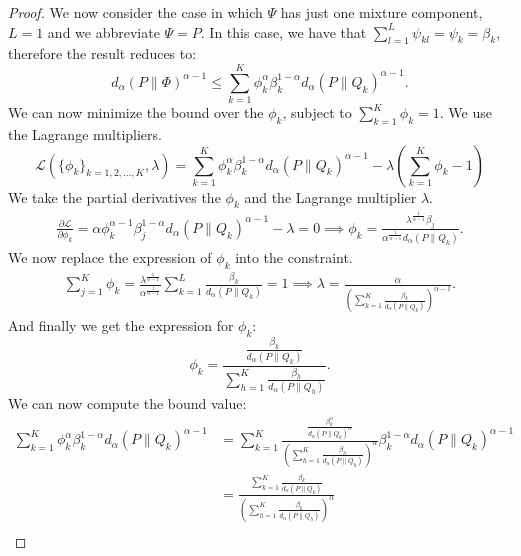 \documentclass{article}
\begin{document}
\armonic*
\begin{proof}
We now consider the case in which $\Psi$ has just one mixture component, \ie $L = 1$ and we abbreviate $\Psi = P$. In this case, we have that $\sum_{l=1}^L \psi_{kl}= \psi_k = \beta_k$, therefore the result reduces to:
\begin{equation}
     d_{\alpha} (P \| \Phi)^{\alpha-1} \le  \sum_{k=1}^K \phi_{k}^\alpha \beta_{k}^{1-\alpha} d_{\alpha} (P \| Q_k)^{\alpha-1}.
\end{equation}
We can now minimize the bound over the $\phi_k$, subject to $\sum_{k=1}^K \phi_k = 1$. We use the Lagrange multipliers.
    \begin{equation*}
        \mathcal{L}(\{\phi_k\}_{k=1,2,...,K}, \lambda) = \sum_{k=1}^K \phi_{k}^\alpha \beta_{k}^{1-\alpha} d_{\alpha} (P \| Q_k)^{\alpha-1} - \lambda \left( \sum_{k=1}^K \phi_k -1 \right)
    \end{equation*}
    We take the partial derivatives \wrt the $\phi_k$ and the Lagrange multiplier $\lambda$.
    \begin{align*}
        \frac{\partial \mathcal{L}}{\partial \phi_k} = \alpha \phi_k^{\alpha-1} \beta_j^{1-\alpha} d_{\alpha}(P \| Q_k)^{\alpha-1} - \lambda = 0 \implies \phi_k = \frac{\lambda^{\frac{1}{\alpha-1}}  \beta_j}{\alpha^{\frac{1}{\alpha-1}} d_{\alpha}(P \| Q_k)}.
    \end{align*}
    We now replace the expression of $\phi_k$ into the constraint.
    \begin{align*}
        \sum_{j=1}^K \phi_k = \frac{\lambda^\frac{1}{\alpha-1}}{\alpha^\frac{1}{\alpha-1}}  \sum_{k=1}^L \frac{ \beta_k}{ d_{\alpha}(P \| Q_k)} = 1 \implies \lambda = \frac{\alpha}{\left( \sum_{k=1}^K \frac{ \beta_k}{ d_{\alpha}(P \| Q_k)}\right)^{{\alpha-1}}}.
    \end{align*}
    And finally we get the expression for $\phi_k$:
    \begin{equation}
        \phi_k = \frac{\frac{\beta_k}{d_{\alpha}(P \| Q_k)}} {\sum_{h=1}^K \frac{ \beta_h}{ d_{\alpha}(P \| Q_h)}}.
    \end{equation}
    We can now compute the bound value:
    \begin{align*}
        \sum_{k=1}^K \phi_{k}^\alpha \beta_{k}^{1-\alpha} d_{\alpha} (P \| Q_k)^{\alpha-1} & = \sum_{k=1}^K \frac{\frac{\beta_k^{\alpha}}{d_{\alpha}(P \| Q_k)^{\alpha}}} {\left(\sum_{h=1}^K \frac{ \beta_h}{ d_{\alpha}(P \| Q_h)}\right)^{\alpha}} \beta_{k}^{1-\alpha} d_{\alpha} (P \| Q_k)^{\alpha-1} \\
        & = \frac{ \sum_{k=1}^K \frac{\beta_k}{d_{\alpha}(P \| Q_k)} }{\left(\sum_{h=1}^K \frac{ \beta_h}{ d_{\alpha}(P \| Q_h)}\right)^{\alpha}} \\

\end{align*}
\end{proof}
\end{document}
